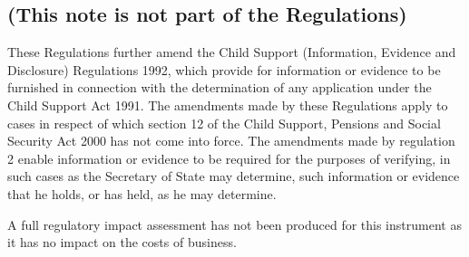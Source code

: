 \documentclass[12pt,a4paper]{article}
\begin{document}
\renewcommand\parthead{— Explanatory Note}

\subsection*{(This note is not part of the Regulations)}

These Regulations further amend the Child Support (Information, Evidence and Disclosure) Regulations 1992, which provide for information or evidence to be furnished in connection with the determination of any application under the Child Support Act 1991. The amendments made by these Regulations apply to cases in respect of which section 12 of the Child Support, Pensions and Social Security Act 2000 has not come into force. The amendments made by regulation 2 enable information or evidence to be required for the purposes of verifying, in such cases as the Secretary of State may determine, such information or evidence that he holds, or has held, as he may determine.

A full regulatory impact assessment has not been produced for this instrument as it has no impact on the costs of business. 
\end{document}
